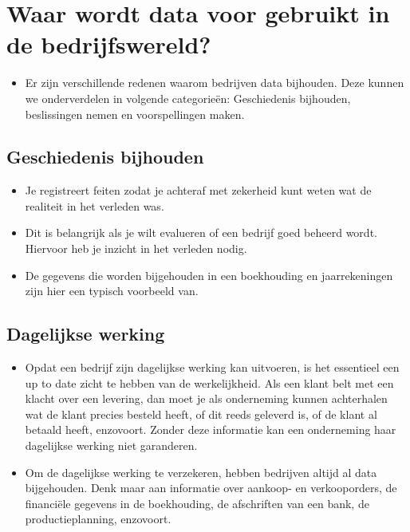 \documentclass[]{memoir}
\providecommand{\tightlist}{%
  \setlength{\itemsep}{0pt}\setlength{\parskip}{0pt}}
\begin{document}
\section{Waar wordt data voor gebruikt in de
bedrijfswereld?}\label{waar-wordt-data-voor-gebruikt-in-de-bedrijfswereld}

\begin{itemize}
\tightlist
\item
  Er zijn verschillende redenen waarom bedrijven data bijhouden. Deze
  kunnen we onderverdelen in volgende categorieën: Geschiedenis
  bijhouden, beslissingen nemen en voorspellingen maken.
\end{itemize}

\subsection*{Geschiedenis bijhouden}\label{geschiedenis-bijhouden}

\begin{itemize}
\tightlist
\item
  Je registreert feiten zodat je achteraf met zekerheid kunt weten wat
  de realiteit in het verleden was.
\item
  Dit is belangrijk als je wilt evalueren of een bedrijf goed beheerd
  wordt. Hiervoor heb je inzicht in het verleden nodig.
\item
  De gegevens die worden bijgehouden in een boekhouding en
  jaarrekeningen zijn hier een typisch voorbeeld van.
\end{itemize}

\subsection*{Dagelijkse werking}\label{dagelijkse-werking}

\begin{itemize}
\tightlist
\item
  Opdat een bedrijf zijn dagelijkse werking kan uitvoeren, is het
  essentieel een up to date zicht te hebben van de werkelijkheid. Als
  een klant belt met een klacht over een levering, dan moet je als
  onderneming kunnen achterhalen wat de klant precies besteld heeft, of
  dit reeds geleverd is, of de klant al betaald heeft, enzovoort. Zonder
  deze informatie kan een onderneming haar dagelijkse werking niet
  garanderen.
\item
  Om de dagelijkse werking te verzekeren, hebben bedrijven altijd al
  data bijgehouden. Denk maar aan informatie over aankoop- en
  verkooporders, de financiële gegevens in de boekhouding, de
  afschriften van een bank, de productieplanning, enzovoort.
\end{itemize}
\end{document}
